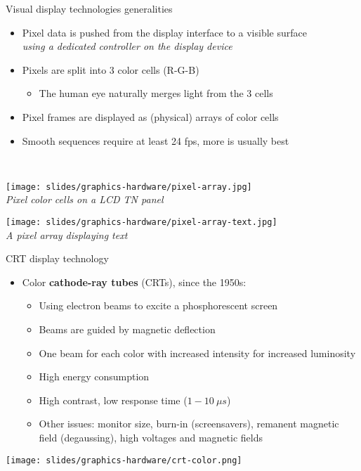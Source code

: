 \begin{frame}{Visual display technologies generalities}
  \begin{itemize}
  \item Pixel data is pushed from the display interface to a visible surface\\
  \textit{using a dedicated controller on the display device}
  \item Pixels are split into 3 color cells (R-G-B)
    \begin{itemize}
    \item The human eye naturally merges light from the 3 cells
    \end{itemize}
  \item Pixel frames are displayed as (physical) arrays of color cells
  \item Smooth sequences require at least 24 fps, more is usually best
  \end{itemize}~

  \begin{minipage}[b]{0.45\textwidth}
    \centering
    \texttt{[image: slides/graphics-hardware/pixel-array.jpg]}\\
    \textit{\small Pixel color cells on a LCD TN panel}
  \end{minipage}
  \hfill
  \begin{minipage}[b]{0.45\textwidth}
    \centering
    \texttt{[image: slides/graphics-hardware/pixel-array-text.jpg]}\\
    \textit{\small A pixel array displaying text}
  \end{minipage}
\end{frame}

\begin{frame}{CRT display technology}
  \begin{itemize}
  \item Color \textbf{cathode-ray tubes} (CRTs), since the 1950s:
    \begin{itemize}
    \item Using electron beams to excite a phosphorescent screen
    \item Beams are guided by magnetic deflection
    \item One beam for each color with increased intensity for increased luminosity
    \item High energy consumption
    \item High contrast, low response time (\(1-10~\mu s\))
    \item Other issues: monitor size, burn-in (screensavers), remanent magnetic field (degaussing), high voltages and magnetic fields
    \end{itemize}
  \end{itemize}

  \begin{center}
  \texttt{[image: slides/graphics-hardware/crt-color.png]}
  \end{center}
\end{frame}

